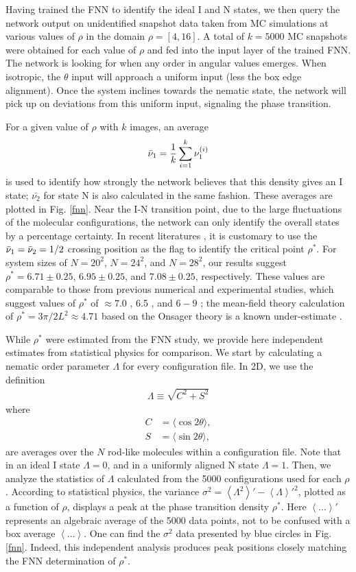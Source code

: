 Having trained the FNN to identify the ideal I and N states, we then query the network output on unidentified snapshot data taken from MC simulations at various values of $\rho$ in the domain $\rho=[4,16]$. A total of $k=5000$ MC  snapshots were obtained for each value of $\rho$ and fed into the input layer of the trained FNN. The network is looking for when any order in angular values emerges.
When isotropic, the $\theta$ input will approach a uniform input (less the box edge alignment). Once the system inclines towards the nematic state, the network will pick up on deviations from this uniform input, signaling the phase transition.

For a given value of $\rho$ with $k$ images, an average
$$
\bar \nu_1 = {1\over k} \sum_{i=1}^{k} \nu_1^{(i)}
$$
is used to identify how strongly the network believes that this density gives an I state;  $\bar{\nu_2}$ for state N is also calculated in the same fashion. These averages are  plotted in Fig. \ref{fnn}. Near the I-N transition point, due to the large fluctuations of the molecular configurations, the network can only identify the overall states by a percentage certainty. In recent literatures \cite{wei,carras,vanN}, it is customary to use the $\bar \nu_{\rm 1}=\bar \nu_{\rm 2}=1/2$ crossing position as the flag to identify the critical point $\rho^*$.
For system sizes of $N=20^2$, $N=24^2$, and $N=28^2$,
our results suggest $\rho^* = 6.71\pm 0.25$, $6.95\pm 0.25$, and $7.08\pm 0.25$,
respectively.
These values are comparable to those from previous numerical and experimental studies, which suggest values of $\rho^*$ of $\approx 7.0$ \cite{frenkel}, 6.5 \cite{cosentino}, and $6-9$ \cite{galanis};
the mean-field theory calculation of $\rho^* =  3\pi/2L^2 \approx 4.71$
based on the Onsager theory is a known under-estimate
\cite{Kayser1978,Chen1993prl}.


While $\rho^*$ were estimated from the FNN study, we provide here independent estimates from statistical physics for comparison. We start by calculating a nematic order parameter $\Lambda$ for every configuration file. In 2D, we use the definition
\begin{align}
\Lambda \equiv \sqrt{C^2 + S^2}
\label{lambda}
\end{align}
where
\begin{align*}
C &= \langle\cos 2\theta\rangle,\\
S &= \langle\sin 2\theta\rangle,
\end{align*}
are averages over the $N$ rod-like molecules within a configuration file. Note that in an ideal I state $\Lambda=0$, and in a uniformly aligned N state $\Lambda = 1$.
Then, we analyze the statistics of $\Lambda$ calculated from the 5000 configurations used for each $\rho$. According to statistical physics, the variance
$\sigma^2 = \left< \Lambda^2 \right >'-\left< \Lambda \right >'^2$, plotted as a function of $\rho$, displays a peak at the phase transition density $\rho^*$. Here $\left< ... \right>'$ represents an algebraic average of the 5000 data points, not to be confused with a box average $\left< ... \right>$. One can find the $\sigma^2$ data presented by blue circles in Fig. \ref{fnn}. Indeed, this independent analysis produces peak positions closely matching the FNN determination of $\rho^*$.

